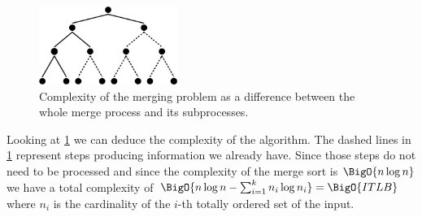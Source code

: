 \begin{figure}
	\centering
	\includegraphics[width=0.4\textwidth]{fig/merging/huffman-2-trim}
	\caption{Complexity of the merging problem as a difference between the whole merge process and its subprocesses.}
	\label{tree:merging:fig/huffman-2}
\end{figure}

Looking at \ref{tree:merging:fig/huffman-2} we can deduce the complexity of the
algorithm. The dashed lines in \ref{tree:merging:fig/huffman-2} represent steps
producing information we already have. Since those steps do not need to be
processed and since the complexity of the merge sort is $\BigO{n \log n}$ we
have a total complexity of $\BigO{n \log n - \sum_{i=1}^{k} n_i \log n_i} =
\BigO{ITLB}$ where $n_i$ is the cardinality of the $i$-th totally ordered set
of the input.
